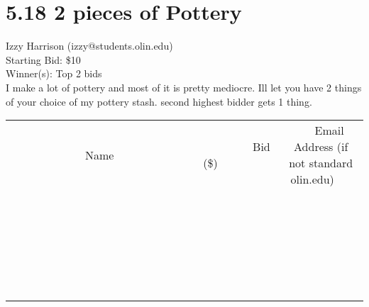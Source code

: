 \documentclass[11pt]{article}
\begin{document}
\section*{5.18 2 pieces of Pottery}
Izzy Harrison (izzy@students.olin.edu) \\
Starting Bid: \$10 \\
Winner(s): 
Top 2 bids \\
I make a lot of pottery and most of it is pretty mediocre. Ill let you have 2 things of your choice of my pottery stash. second highest bidder gets 1 thing. \\[6ex]
\begin{tabular}{c c c}
~~~~~~~~~~~~~Name~~~~~~~~~~~~~ & ~~~~~~~~~Bid (\$)~~~~~~~~~ & ~~~Email Address (if not standard olin.edu)~~~ \\
 & & \\
\hline
 & & \\
\hline
 & & \\
\hline
 & & \\
\hline
 & & \\
\hline
 & & \\
\hline
 & & \\
\hline
 & & \\
\hline
 & & \\
\hline
 & & \\
\hline
 & & \\
\hline
 & & \\
\hline
 & & \\
\hline
 & & \\
\hline
 & & \\
\hline
 & & \\
\hline
 & & \\
\hline
 & & \\
\hline
 & & \\
\hline
 & & \\
\hline
 & & \\
\hline
 & & \\
\hline
 & & \\
\hline
 & & \\
\hline
 & & \\
\hline
 & & \\
\hline
\end{tabular}
\clearpage
\end{document}
